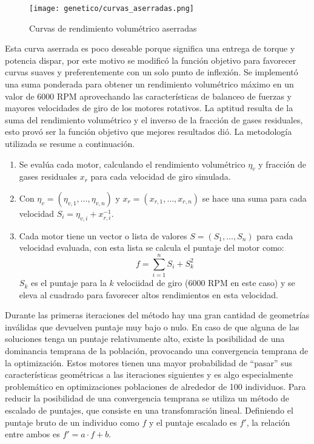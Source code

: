 \begin{figure}[ht]
  \centering
  \texttt{[image: genetico/curvas\_aserradas.png]}
  \caption{Curvas de rendimiento volumétrico aserradas}\label{fig:curva_aserrada}
\end{figure}

Esta curva aserrada es poco deseable porque significa una entrega de torque y
potencia dispar, por este motivo se modificó la función objetivo para favorecer
curvas suaves y preferentemente con un solo punto de inflexión.
%
Se implementó una suma ponderada para obtener un rendimiento volumétrico máximo
en un valor de 6000 RPM aprovechando las características de balanceo de fuerzas
y mayores velocidades de giro de los motores rotativos.
%
La aptitud resulta de la suma del rendimiento volumétrico y el inverso de la
fracción de gases residuales, esto provó ser la función objetivo que mejores
resultados dió.
%
La metodología utilizada se resume a continuación.

\begin{enumerate}
        \item Se evalúa cada motor, calculando el rendimiento volumétrico
$\eta_{v}$ y fracción de gases residuales $x_{r}$ para cada velocidad de giro
simulada.
        \item Con $\eta_{v} = (\eta_{v,1}, \ldots ,\eta_{v,n})$ y
$x_{r}=(x_{r,1},\ldots,x_{r,n})$ se hace una suma para cada velocidad
$S_{i}=\eta_{v,i} + x_{r,i}^{-1}$.
        \item Cada motor tiene un vector o lista de valores
$S = (S_{1},\ldots,S_{n})$ para cada velocidad evaluada, con esta lista se
        calcula el puntaje del motor como:
        \begin{equation}
        f = \sum_{i=1}^{n}{S_{i}} + S_{k}^{2}
        \end{equation} $S_{k}$ es el puntaje para la $k$ velociidad de giro
(6000 RPM en este caso) y se eleva al cuadrado para favorecer altos rendimientos
en esta velocidad.
\end{enumerate}


Durante las primeras iteraciones del método hay una gran cantidad de geometrías
inválidas que devuelven puntaje muy bajo o nulo.
%
En caso de que alguna de las soluciones tenga un puntaje relativamente alto,
existe la posibilidad de una dominancia temprana de la población, provocando
una convergencia temprana de la optimización.
%
Estos motores tienen una mayor probabilidad de ``pasar'' sus características
geométricas a las iteraciones siguientes y es algo especialmente problemático en
optimizaciones poblaciones de alrededor de 100 individuos.
%
Para reducir la posibilidad de una convergencia temprana se utiliza un método de
escalado de puntajes, que consiste en una transfomración lineal.
%
Definiendo el puntaje bruto de un individuo como $f$ y el puntaje escalado es
$f'$, la relación entre ambos es $f' = a\cdot f + b$.

